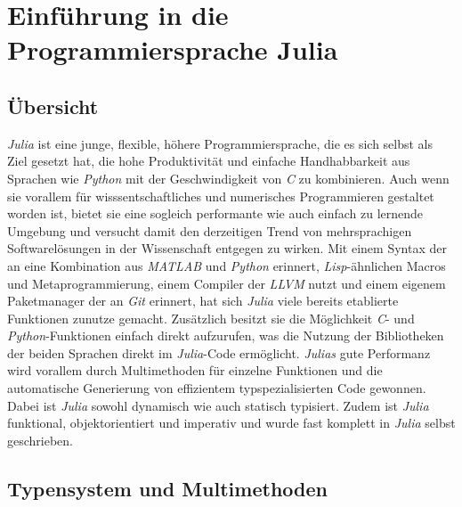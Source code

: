 \documentclass[proseminar,german,utf8]{zihpub}
\begin{document}
\section{Einführung in die Programmiersprache Julia}

\subsection{Übersicht}

\textit{Julia} ist eine junge, flexible, höhere Programmiersprache, die es sich selbst als Ziel gesetzt hat, die hohe Produktivität und einfache Handhabbarkeit aus Sprachen wie \textit{Python} mit der Geschwindigkeit von \textit{C} zu kombinieren. Auch wenn sie vorallem für wisssentschaftliches und numerisches Programmieren gestaltet worden ist, bietet sie eine sogleich performante wie auch einfach zu lernende Umgebung und versucht damit den derzeitigen Trend von mehrsprachigen Softwarelösungen in der Wissenschaft entgegen zu wirken. Mit einem Syntax der an eine Kombination aus \textit{MATLAB} und \textit{Python} erinnert, \textit{Lisp}-ähnlichen Macros und Metaprogrammierung, einem Compiler der \textit{LLVM} nutzt und einem eigenem Paketmanager der an \textit{Git} erinnert, hat sich \textit{Julia} viele bereits etablierte Funktionen zunutze gemacht. Zusätzlich besitzt sie die Möglichkeit \textit{C}- und \textit{Python}-Funktionen einfach direkt aufzurufen, was die Nutzung der Bibliotheken der beiden Sprachen direkt im \textit{Julia}-Code ermöglicht. \textit{Julias} gute Performanz wird vorallem durch Multimethoden für einzelne Funktionen und die automatische Generierung von effizientem typspezialisierten Code gewonnen. Dabei ist \textit{Julia} sowohl dynamisch wie auch statisch typisiert. Zudem ist \textit{Julia} funktional, objektorientiert und imperativ und wurde fast komplett in \textit{Julia} selbst geschrieben.

\subsection{Typensystem und Multimethoden}
\end{document}
